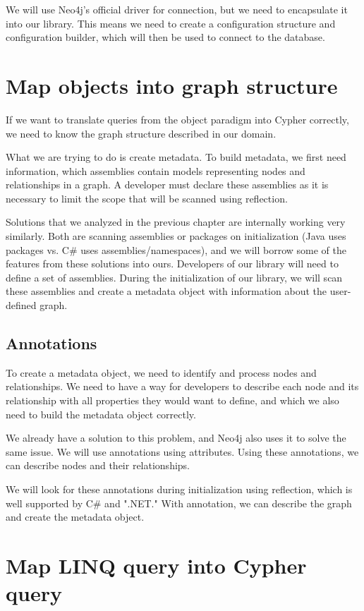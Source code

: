 We will use Neo4j's official driver for connection, but we need to encapsulate it into our library. This means we need to create a configuration structure and configuration builder, which will then be used to connect to the database.

\section {Map objects into graph structure}

If we want to translate queries from the object paradigm into Cypher correctly, we need to know the graph structure described in our domain.

What we are trying to do is create metadata. To build metadata, we first need information, which assemblies contain models representing nodes and relationships in a graph. A developer must declare these assemblies as it is necessary to limit the scope that will be scanned using reflection.

Solutions that we analyzed in the previous chapter are internally working very similarly. Both are scanning assemblies or packages on initialization (Java uses packages vs. C\# uses assemblies/namespaces), and we will borrow some of the features from these solutions into ours.
Developers of our library will need to define a set of assemblies. During the initialization of our library, we will scan these assemblies and create a metadata object with information about the user-defined graph.

\subsection {Annotations}

To create a metadata object, we need to identify and process nodes and relationships. We need to have a way for developers to describe each node and its relationship with all properties they would want to define, and which we also need to build the metadata object correctly.

We already have a solution to this problem, and Neo4j also uses it to solve the same issue. We will use annotations using attributes. Using these annotations, we can describe nodes and their relationships.

We will look for these annotations during initialization using reflection, which is well supported by C\# and ".NET." With annotation, we can describe the graph and create the metadata object.

\section {Map LINQ query into Cypher query}

